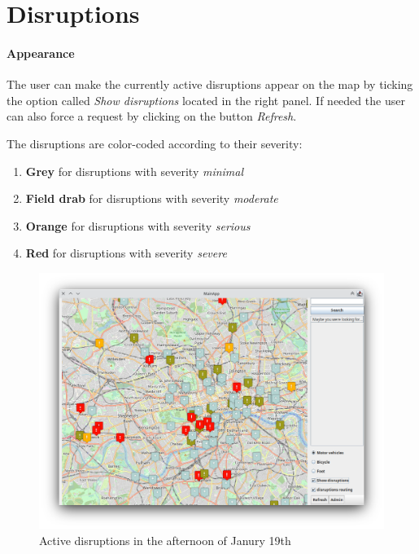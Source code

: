 \section{Disruptions}

\paragraph{Appearance}
The user can make the currently active disruptions appear on the map by ticking 
the option called \textit{Show disruptions} located in the right panel. If 
needed the user can also force a request by clicking on the button 
\textit{Refresh}.

The disruptions are color-coded according to their severity:

\begin{enumerate}
	\item \textbf{Grey} for disruptions with severity \textit{minimal}
	\item \textbf{Field drab} for disruptions with severity \textit{moderate}
	\item \textbf{Orange} for disruptions with severity \textit{serious}
	\item \textbf{Red} for disruptions with severity \textit{severe}
\end{enumerate}

\begin{figure}[H]
	\centering
	\includegraphics[width=\linewidth]{assets/mainapp2}
	\caption{Active disruptions in the afternoon of Janury 19th}
	\label{fig:mainapp2}
\end{figure}

